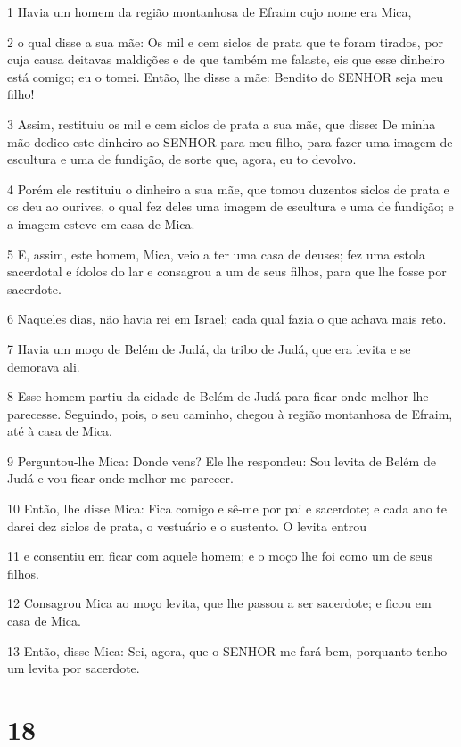 \par 1 Havia um homem da região montanhosa de Efraim cujo nome era Mica,
\par 2 o qual disse a sua mãe: Os mil e cem siclos de prata que te foram tirados, por cuja causa deitavas maldições e de que também me falaste, eis que esse dinheiro está comigo; eu o tomei. Então, lhe disse a mãe: Bendito do SENHOR seja meu filho!
\par 3 Assim, restituiu os mil e cem siclos de prata a sua mãe, que disse: De minha mão dedico este dinheiro ao SENHOR para meu filho, para fazer uma imagem de escultura e uma de fundição, de sorte que, agora, eu to devolvo.
\par 4 Porém ele restituiu o dinheiro a sua mãe, que tomou duzentos siclos de prata e os deu ao ourives, o qual fez deles uma imagem de escultura e uma de fundição; e a imagem esteve em casa de Mica.
\par 5 E, assim, este homem, Mica, veio a ter uma casa de deuses; fez uma estola sacerdotal e ídolos do lar e consagrou a um de seus filhos, para que lhe fosse por sacerdote.
\par 6 Naqueles dias, não havia rei em Israel; cada qual fazia o que achava mais reto.
\par 7 Havia um moço de Belém de Judá, da tribo de Judá, que era levita e se demorava ali.
\par 8 Esse homem partiu da cidade de Belém de Judá para ficar onde melhor lhe parecesse. Seguindo, pois, o seu caminho, chegou à região montanhosa de Efraim, até à casa de Mica.
\par 9 Perguntou-lhe Mica: Donde vens? Ele lhe respondeu: Sou levita de Belém de Judá e vou ficar onde melhor me parecer.
\par 10 Então, lhe disse Mica: Fica comigo e sê-me por pai e sacerdote; e cada ano te darei dez siclos de prata, o vestuário e o sustento. O levita entrou
\par 11 e consentiu em ficar com aquele homem; e o moço lhe foi como um de seus filhos.
\par 12 Consagrou Mica ao moço levita, que lhe passou a ser sacerdote; e ficou em casa de Mica.
\par 13 Então, disse Mica: Sei, agora, que o SENHOR me fará bem, porquanto tenho um levita por sacerdote.

\chapter{18}

